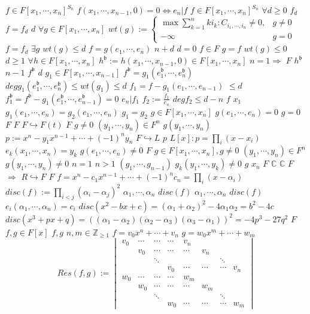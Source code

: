 \documentclass{article}
\begin{document}
$f \in F[x_1,\cdots,x_n]^{S_n}$
$f(x_1,\cdots,x_{n-1},0)=0 \Leftrightarrow e_n|f$
$f \in F[x_1,\cdots,x_n]^{S_n}$
$\forall d \geq 0$
$f_d$
$f=f_d$
$d$
$\forall g \in F[x_1,\cdots,x_n]$
$wt(g):=\begin{cases}\max{\sum_{k=1}^{n}ki_k:C_{i_1,\cdots,i_n} \neq 0},& g \neq 0\\-\infty &g=0\end{cases}$
$f=f_d$
$\exists g$
$wt(g) \leq d$
$f=g(e_1,\cdots,e_n)$
$n+d$
$d=0$
$f \in F$
$g=f$
$wt(g) \leq 0$
$d \geq 1$
$\forall h \in F[x_1, \cdots,x_n]$
$h^{\mathfrak{b}}:=h(x_1,\cdots,x_{n-1},0)\in F[x_1,\cdots,x_n]$
$n=1 \Rightarrow$
$F$
$h^{\mathfrak{b}}$
$n-1$
$f^\mathfrak{b}$
$d$
$g_1 \in F[x_1, \cdots,x_{n-1}]$
$f^\mathfrak{b}=g_1(e_1^{\mathfrak{b}},\cdots,e_n^{\mathfrak{b}})$
$degg_1(e_1^{\mathfrak{b}},\cdots,e_n^{\mathfrak{b}}) \leq wt(g_1) \leq d$
$f_1=f-g_1(e_1,\cdots,e_{n-1})$
$\leq d$
$f_1^{\mathfrak{b}}=f^{\mathfrak{b}}-g_1(e_1^{\mathfrak{b}},\cdots,e_{n-1}^{\mathfrak{b}})=0$
$e_n|f_1$
$f_2:=\frac{f_1}{e_n}$
$degf_2 \leq d-n$
$f$
$x_1$
$g_1(e_1,\cdots,e_n)=g_2(e_1,\cdots,e_n)$
$g_1=g_2$
$g \in F[x_1,\cdots,x_n]$
$g(e_1,\cdots,e_n)=0$
$g=0$
$F$
$F$
$F \hookrightarrow F(t)$
$F$
$g \neq 0$
$(y_1, \cdots,y_n) \in F^{n}$
$g(y_1, \cdots,y_n)$
$p:=x^n-y_1x^{n-1}+ \cdots+(-1)^{n}y_n$
$F \hookrightarrow L$
$p$
$L[x]:p=\prod_i(x-x_i)$
$e_k(x_1, \cdots, x_n)=y_k$
$g(e_1, \cdots,e_n) \neq 0$
$F$
$g \in F[x_1, \cdots,x_n],g \neq 0$
$(y_1, \cdots,y_n) \in F^n$
$g(y_1,\cdots,y_n) \neq 0$
$n=1$
$n>1$
$(g_1,\cdots,g_{n-1})$
$g_k(y_1,\cdots,y_k) \neq 0$
$g$
$x_n$
$F$
$\mathbb{C}$
$\mathbb{C}$
$F$
$\Rightarrow$
$R \hookrightarrow F$
$F$
$f=x^n-c_{1}x^{n-1} + \cdots+(-1)^nc_{n}=\prod_i(x-\alpha_i)$
$disc(f):=\prod_{i<j}(\alpha_i-\alpha_j)^2$
$\alpha_1,\cdots,\alpha_n$
$disc(f)$
$\alpha_1, \cdots,\alpha_n$
$disc(f)$
$e_i(\alpha_1, \cdots,\alpha_n)=c_i$
$disc(x^2-bx+c)=(\alpha_1+\alpha_2)^2-4\alpha_1\alpha_2=b^2-4c$
$disc(x^3+px+q)=((\alpha_1-\alpha_2)(\alpha_2-\alpha_3)(\alpha_3-\alpha_1))^2=-4p^3-27q^2$
$F$
$f,g \in F[x]$
$f,g$
$n,m \in \mathbb{Z}_{\geq 1}$
$f=v_0x^n+ \cdots+v_n$
$g=w_0x^m+\cdots+w_m$
$$
Res(f,g):=\begin{vmatrix}v_0&\cdots&\cdots&\cdots&v_n\\&v_0&\cdots&\cdots&\cdots&v_n\\&&\ddots&&&&\ddots\\&&&v_0&\cdots&\cdots&\cdots&v_n\\
w_0&\cdots&\cdots&\cdots&w_m\\&w_0&\cdots&\cdots&\cdots&w_m\\&&\ddots&&&&\ddots\\&&&w_0&\cdots&\cdots&\cdots&w_m\end{vmatrix}
$$
\end{document}
